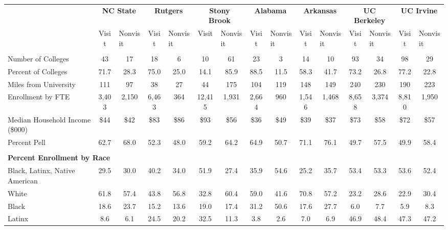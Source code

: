 \begin{tabular*}{\linewidth}{@{\extracolsep{\fill} } lcccccccccccccc}%
&\multicolumn{2}{c}{\bfseries NC State}&\multicolumn{2}{c}{\bfseries Rutgers}&\multicolumn{2}{c}{\bfseries Stony Brook}&\multicolumn{2}{c}{\bfseries Alabama}&\multicolumn{2}{c}{\bfseries Arkansas}&\multicolumn{2}{c}{\bfseries UC Berkeley}&\multicolumn{2}{c}{\bfseries UC Irvine}\\%
&Visit&\multicolumn{1}{l}{Nonvisit}&Visit&\multicolumn{1}{l}{Nonvisit}&Visit&\multicolumn{1}{l}{Nonvisit}&Visit&\multicolumn{1}{l}{Nonvisit}&Visit&\multicolumn{1}{l}{Nonvisit}&Visit&\multicolumn{1}{l}{Nonvisit}&Visit&\multicolumn{1}{l}{Nonvisit}\\%
\hline%
&&&&&&&&&&&&&&\\%
\hspace{0cm}Number of Colleges&43&17&18&6&10&61&23&3&14&10&93&34&98&29\\%
Percent of Colleges&71.7&28.3&75.0&25.0&14.1&85.9&88.5&11.5&58.3&41.7&73.2&26.8&77.2&22.8\\%
\hspace{0cm}Miles from University&111&97&38&27&44&175&104&119&148&149&240&230&190&223\\%
\hspace{0cm}Enrollment by FTE&3,403&2,150&6,463&364&12,415&1,931&2,664&960&1,546&1,468&8,658&3,374&8,810&1,950\\%
\hspace{0cm}Median Household Income (\$000)&\$44&\$42&\$83&\$86&\$93&\$56&\$36&\$49&\$39&\$37&\$73&\$58&\$72&\$57\\%
\hspace{0cm}Percent Pell&62.7&68.0&52.3&48.0&59.2&64.2&64.9&50.7&71.1&76.1&49.7&57.5&49.9&58.4\\%
&&&&&&&&&&&&&&\\%
\multicolumn{15}{l}{\bfseries Percent Enrollment by Race}\\%
\hspace{0.2cm}Black, Latinx, Native American&29.5&30.0&40.2&34.0&51.9&27.4&35.9&54.6&25.2&35.7&53.4&53.3&53.6&52.4\\%
\hspace{0.2cm}White&61.8&57.4&43.8&56.8&32.8&60.4&59.0&41.6&70.8&57.2&23.2&28.6&22.9&30.4\\%
\hspace{0.2cm}Black&18.6&23.7&15.2&13.6&19.0&17.4&31.2&50.6&17.6&27.7&6.0&7.7&5.9&8.3\\%
\hspace{0.2cm}Latinx&8.6&6.1&24.5&20.2&32.5&11.3&3.8&2.6&7.0&6.9&46.9&48.4&47.3&47.2\\%

\end{tabular*}
